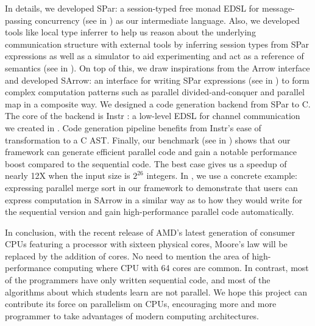 In details, we developed SPar: a session-typed free monad EDSL for message-passing concurrency (see in ) as our intermediate language. Also, we developed tools like local type inferrer to help us reason about the underlying communication structure with external tools by inferring session types from SPar expressions as well as a simulator to aid experimenting and act as a reference of semantics (see in ). On top of this, we draw inspirations from the Arrow interface and developed SArrow: an interface for writing SPar expressions (see in ) to form complex computation patterns such as parallel divided-and-conquer and parallel map in a composite way. We designed a code generation backend from SPar to C. The core of the backend is Instr : a low-level EDSL for channel communication we created in . Code generation pipeline benefits from Instr's ease of transformation to a C AST. Finally, our benchmark (see in ) shows that our framework can generate efficient parallel code and gain a notable performance boost compared to the sequential code. The best case gives us a speedup of nearly 12X when the input size is $2^26$ integers. In , we use a concrete example: expressing parallel merge sort in our framework to demonstrate that users can express computation in SArrow in a similar way as to how they would write for the sequential version and gain high-performance parallel code automatically.

In conclusion, with the recent release of AMD's latest generation of consumer CPUs featuring a processor with sixteen physical cores, Moore's law will be replaced by the addition of cores. No need to mention the area of high-performance computing where CPU with 64 cores are common. In contrast, most of the programmers have only written sequential code, and most of the algorithms about which students learn are not parallel. We hope this project can contribute its force on parallelism on CPUs, encouraging more and more programmer to take advantages of modern computing architectures.
